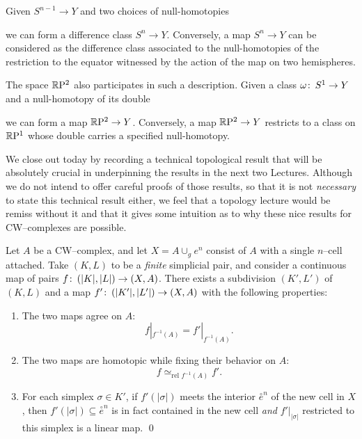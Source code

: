 \begin{example}
Given $S^{n-1} \to Y$ and two choices of null-homotopies
\begin{center}
\end{center}
we can form a difference class $S^n \to Y$.
Conversely, a map $S^n \to Y$ can be considered as the difference class associated to the null-homotopies of the restriction to the equator witnessed by the action of the map on two hemispheres.
\end{example}

\begin{example}
The space $\mathbb R \mathrm{P}^2$ also participates in such a description.
Given a class $\omega\colon\thinspace S^1 \to Y$ and a null-homotopy of its double
\begin{center}
\end{center}
we can form a map $\mathbb R \mathrm{P}^2 \to Y$.
Conversely, a map $\mathbb R \mathrm{P}^2 \to Y$ restricts to a class on $\mathbb R \mathrm{P}^1$ whose double carries a specified null-homotopy.
\end{example}

We close out today by recording a technical topological result that will be absolutely crucial in underpinning the results in the next two Lectures.
Although we do not intend to offer careful proofs of those results, so that it is not \emph{necessary} to state this technical result either, we feel that a topology lecture would be remiss without it and that it gives some intuition as to why these nice results for CW--complexes are possible.

\begin{lemma}%
Let $A$ be a CW--complex, and let $X = A \cup_g e^n$ consist of $A$ with a single $n$--cell attached.
Take $(K, L)$ to be a \emph{finite} simplicial pair, and consider a continuous map of pairs $f\colon\thinspace (|K|, |L|) \to (X, A)$.
There exists a subdivision $(K', L')$ of $(K, L)$ and a map $f'\colon\thinspace (|K'|, |L'|) \to (X, A)$ with the following properties:
\begin{enumerate}
    \item The two maps agree on $A$: \[f|_{f^{-1}(A)} = f'|_{f^{-1}(A)}.\]
    \item The two maps are homotopic while fixing their behavior on $A$: \[f \simeq_{\text{rel $f^{-1}(A)$}} f'.\]
    \item For each simplex $\sigma \in K'$, if $f'(|\sigma|)$ meets the interior $\overset \circ e^n$ of the new cell in $X$, then $f'(|\sigma|) \subseteq \overset \circ e^n$ is in fact contained in the new cell \emph{and} $f'|_{|\sigma|}$ restricted to this simplex is a linear map. \qed
\end{enumerate}
\end{lemma}





